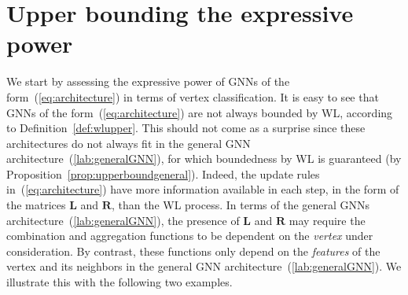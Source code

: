\section{Upper bounding the expressive power}
We start by assessing the expressive power of GNNs of the form~(\ref{eq:architecture}) in terms of vertex classification.
It is easy to see that GNNs of the form~(\ref{eq:architecture}) are not always bounded by WL, according to 
Definition~\ref{def:wlupper}. This should not come as a surprise since these architectures do not always fit in the general
GNN architecture~(\ref{lab:generalGNN}), for which boundedness by WL is guaranteed (by Proposition~\ref{prop:upperboundgeneral}).
Indeed, the update rules in~(\ref{eq:architecture})  have more information available in each step, in the form of the matrices $\mathbf{L}$ and $\mathbf{R}$, than the WL process. In terms of the general GNNs architecture~(\ref{lab:generalGNN}), the presence of $\mathbf{L}$ and $\mathbf{R}$ may require the combination and aggregation functions to be dependent on the \textit{vertex} under consideration. By contrast, these functions only depend on the \textit{features} of the vertex and its neighbors in the general GNN architecture~(\ref{lab:generalGNN}). We illustrate this with the following two examples.

